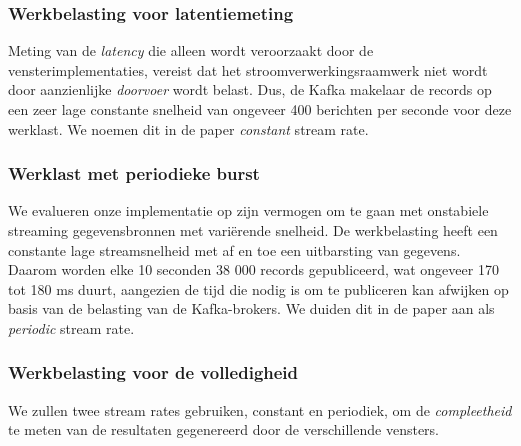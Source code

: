 \subsubsection{Werkbelasting voor latentiemeting}
Meting van de \emph{latency} die alleen wordt veroorzaakt 
door de vensterimplementaties, vereist dat het stroomverwerkingsraamwerk niet wordt 
door aanzienlijke \emph{doorvoer} wordt belast. Dus, de Kafka makelaar 
de records op een zeer lage constante snelheid van ongeveer 400 berichten per seconde voor 
deze werklast.
We noemen dit in de paper \emph{constant} stream rate. 

\subsubsection{Werklast met periodieke burst}
We evalueren onze implementatie op zijn vermogen om te gaan met onstabiele 
streaming gegevensbronnen met variërende snelheid.
De werkbelasting heeft een constante lage streamsnelheid met af en toe een 
uitbarsting van gegevens. Daarom worden elke 10 seconden 38 000 records gepubliceerd, wat 
ongeveer 170 tot 180 ms duurt, aangezien de tijd die nodig is om te publiceren kan afwijken op basis van de 
belasting van de Kafka-brokers.
We duiden dit in de paper aan als \emph{periodic} stream rate. 

\subsubsection{Werkbelasting voor de volledigheid}
We zullen twee stream rates gebruiken, constant en periodiek, 
om de \emph{compleetheid} te meten van de resultaten gegenereerd 
door de verschillende vensters.






